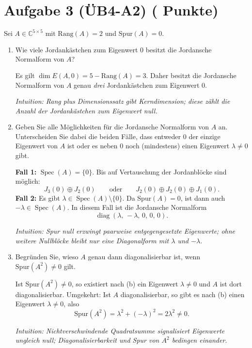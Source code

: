 \documentclass[11pt, a4paper]{article}
\newcommand{\aufgabe}[2]{%
  \section*{\Large\bfseries Aufgabe #1%
  \if\relax\detokenize{#2}\relax\else \hfill\normalfont\normalsize(#2 Punkte)\fi}%
  \vspace{-1.5ex}
}
\begin{document}
\aufgabe{3 (ÜB4-A2)}{}
Sei $A\in\mathbb{C}^{5\times 5}$ mit $\mathrm{Rang}(A)=2$ und $\mathrm{Spur}(A)=0$.
\begin{enumerate}
  \item Wie viele Jordankästchen zum Eigenwert $0$ besitzt die Jordansche Normalform von $A$?
  \begin{framed}
  Es gilt $\dim E(A,0)=5-\mathrm{Rang}(A)=3$. Daher besitzt die Jordansche
  Normalform von $A$ genau \emph{drei} Jordankästchen zum Eigenwert $0$.

  \medskip\noindent\textit{Intuition: Rang plus Dimensionssatz gibt Kerndimension; diese zählt die Anzahl der Jordankästchen zum Eigenwert null.}
  \end{framed}

  \item Geben Sie alle Möglichkeiten für die Jordansche Normalform von $A$ an. Unterscheiden Sie dabei die beiden Fälle, dass entweder $0$ der einzige Eigenwert von $A$ ist oder es neben $0$ noch (mindestens) einen Eigenwert $\lambda\neq 0$ gibt.
  \begin{framed}
  \textbf{Fall 1:} $\operatorname{Spec}(A)=\{0\}$. Bis auf Vertauschung der
  Jordanblöcke sind möglich:
  \[
    J_3(0)\oplus J_2(0)
    \qquad\text{oder}\qquad
    J_2(0)\oplus J_2(0)\oplus J_1(0).
  \]
  \textbf{Fall 2:} Es gibt $\lambda\in\operatorname{Spec}(A)\setminus\{0\}$.
  Da $\mathrm{Spur}(A)=0$, ist dann auch $-\lambda\in\operatorname{Spec}(A)$.
  In diesem Fall ist die Jordansche Normalform
  \[
    \operatorname{diag}(\lambda,\,-\lambda,\,0,\,0,\,0).
  \]

  \medskip\noindent\textit{Intuition: Spur null erzwingt paarweise entgegengesetzte Eigenwerte; ohne weitere Nullblöcke bleibt nur eine Diagonalform mit $\lambda$ und $-\lambda$.}
  \end{framed}

  \item Begründen Sie, wieso $A$ genau dann diagonalisierbar ist, wenn $\mathrm{Spur}(A^2)\neq 0$ gilt.
  \begin{framed}
  Ist $\mathrm{Spur}(A^2)\neq 0$, so existiert nach (b) ein Eigenwert
  $\lambda\neq 0$ und $A$ ist dort diagonalisierbar. Umgekehrt:
  Ist $A$ diagonalisierbar, so gibt es nach (b) einen Eigenwert $\lambda\neq 0$,
  also
  \[
    \mathrm{Spur}(A^2)=\lambda^2+(-\lambda)^2=2\lambda^2\neq 0.
  \]

  \medskip\noindent\textit{Intuition: Nichtverschwindende Quadratsumme signalisiert Eigenwerte ungleich null; Diagonalisierbarkeit und Spur von $A^2$ bedingen einander.}
  \end{framed}
\end{enumerate}
\end{document}
